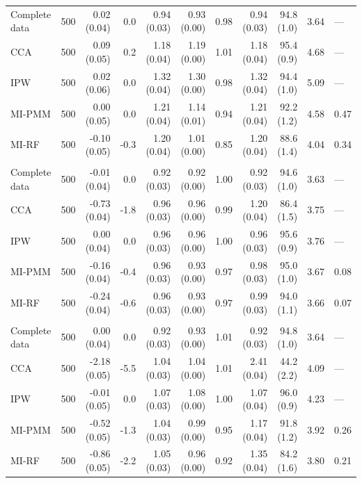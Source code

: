 \begin{longtable}{l|rrrrrrrrrl}
\midrule\addlinespace[2.5pt]
\multicolumn{11}{l}{Stunting — MAR 50\%} \\[2.5pt] 
\midrule\addlinespace[2.5pt]
Complete data & 500 & 0.02 (0.04) & 0.0 & 0.94 (0.03) & 0.93 (0.00) & 0.98 & 0.94 (0.03) & 94.8 (1.0) & 3.64 & — \\ 
CCA & 500 & 0.09 (0.05) & 0.2 & 1.18 (0.04) & 1.19 (0.00) & 1.01 & 1.18 (0.04) & 95.4 (0.9) & 4.68 & — \\ 
IPW & 500 & 0.02 (0.06) & 0.0 & 1.32 (0.04) & 1.30 (0.00) & 0.98 & 1.32 (0.04) & 94.4 (1.0) & 5.09 & — \\ 
MI-PMM & 500 & 0.00 (0.05) & 0.0 & 1.21 (0.04) & 1.14 (0.01) & 0.94 & 1.21 (0.04) & 92.2 (1.2) & 4.58 & 0.47 \\ 
MI-RF & 500 & -0.10 (0.05) & -0.3 & 1.20 (0.04) & 1.01 (0.00) & 0.85 & 1.20 (0.04) & 88.6 (1.4) & 4.04 & 0.34 \\ 
\midrule\addlinespace[2.5pt]
\multicolumn{11}{l}{Stunting — MAR-strong 10\%} \\[2.5pt] 
\midrule\addlinespace[2.5pt]
Complete data & 500 & -0.01 (0.04) & 0.0 & 0.92 (0.03) & 0.92 (0.00) & 1.00 & 0.92 (0.03) & 94.6 (1.0) & 3.63 & — \\ 
CCA & 500 & -0.73 (0.04) & -1.8 & 0.96 (0.03) & 0.96 (0.00) & 0.99 & 1.20 (0.04) & 86.4 (1.5) & 3.75 & — \\ 
IPW & 500 & 0.00 (0.04) & 0.0 & 0.96 (0.03) & 0.96 (0.00) & 1.00 & 0.96 (0.03) & 95.6 (0.9) & 3.76 & — \\ 
MI-PMM & 500 & -0.16 (0.04) & -0.4 & 0.96 (0.03) & 0.93 (0.00) & 0.97 & 0.98 (0.03) & 95.0 (1.0) & 3.67 & 0.08 \\ 
MI-RF & 500 & -0.24 (0.04) & -0.6 & 0.96 (0.03) & 0.93 (0.00) & 0.97 & 0.99 (0.03) & 94.0 (1.1) & 3.66 & 0.07 \\ 
\midrule\addlinespace[2.5pt]
\multicolumn{11}{l}{Stunting — MAR-strong 30\%} \\[2.5pt] 
\midrule\addlinespace[2.5pt]
Complete data & 500 & 0.00 (0.04) & 0.0 & 0.92 (0.03) & 0.93 (0.00) & 1.01 & 0.92 (0.03) & 94.8 (1.0) & 3.64 & — \\ 
CCA & 500 & -2.18 (0.05) & -5.5 & 1.04 (0.03) & 1.04 (0.00) & 1.01 & 2.41 (0.04) & 44.2 (2.2) & 4.09 & — \\ 
IPW & 500 & -0.01 (0.05) & 0.0 & 1.07 (0.03) & 1.08 (0.00) & 1.00 & 1.07 (0.04) & 96.0 (0.9) & 4.23 & — \\ 
MI-PMM & 500 & -0.52 (0.05) & -1.3 & 1.04 (0.03) & 0.99 (0.00) & 0.95 & 1.17 (0.04) & 91.8 (1.2) & 3.92 & 0.26 \\ 
MI-RF & 500 & -0.86 (0.05) & -2.2 & 1.05 (0.03) & 0.96 (0.00) & 0.92 & 1.35 (0.04) & 84.2 (1.6) & 3.80 & 0.21 \\ 

\end{longtable}

